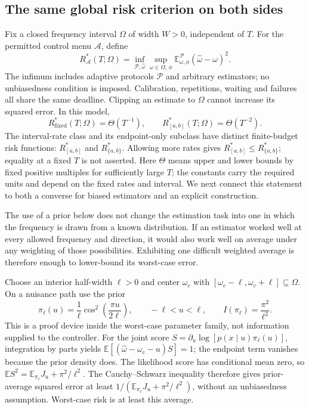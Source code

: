 \documentclass[11pt,a4paper]{article}
\numberwithin{equation}{section}
\theoremstyle{remark}
\begin{document}
\subsection{The same global risk criterion on both sides}

Fix a closed frequency interval $\Omega$ of width $W>0$, independent of $T$.
For the permitted control menu $\mathcal A$, define
\begin{equation}
 R_{\mathcal A}^*(T;\Omega)
 =\inf_{\mathcal P,\widehat\omega}
 \sup_{\omega\in\Omega,\,\phi}
 \mathbb E_{\omega,\phi}^{\mathcal P}
       (\widehat\omega-\omega)^2.
 \label{markov:risk}
\end{equation}
The infimum includes adaptive protocols $\mathcal P$ and arbitrary estimators;
no unbiasedness condition is imposed. Calibration, repetitions, waiting and
failures all share the same deadline. Clipping an estimate to $\Omega$ cannot
increase its squared error. In this model,
\begin{equation}
 R_{\mathrm{fixed}}^*(T;\Omega)=\Theta(T^{-1}),\qquad
 R_{[a,b]}^*(T;\Omega)=\Theta(T^{-2}).
 \label{markov:globaltheorem}
\end{equation}
The interval-rate class and its endpoint-only subclass have distinct
finite-budget risk functions: $R_{[a,b]}^*$ and $R_{\{a,b\}}^*$.
Allowing more rates gives $R_{[a,b]}^*\le R_{\{a,b\}}^*$; equality at a
fixed $T$ is not asserted. Here $\Theta$ means upper and lower bounds by fixed positive multiples for
sufficiently large $T$; the constants carry the required units and depend on
the fixed rates and interval. We next connect this statement to both a
converse for biased estimators and an explicit construction.

The use of a prior below does not change the estimation task into one in which
the frequency is drawn from a known distribution. If an estimator worked
well at every allowed frequency and direction, it would also work well on
average under any weighting of those possibilities. Exhibiting one difficult
weighted average is therefore enough to lower-bound its worst-case error.

Choose an interior half-width $\ell>0$ and center $\omega_c$ with
$[\omega_c-\ell,\omega_c+\ell]\subseteq\Omega$. On a nuisance path use the prior
\begin{equation}
 \pi_\ell(u)=\frac1\ell\cos^2\left(\frac{\pi u}{2\ell}\right),
 \qquad -\ell<u<\ell,\qquad I(\pi_\ell)=\frac{\pi^2}{\ell^2}.
\end{equation}
This is a proof device inside the worst-case parameter family, not information
supplied to the controller. For the joint score
$S=\partial_u\log[p(x\mid u)\pi_\ell(u)]$, integration by parts yields
$\mathbb E[(\widehat\omega-\omega_c-u)S]=1$; the endpoint term vanishes
because the prior density does. The likelihood score has conditional mean
zero, so $\mathbb E S^2=\mathbb E_{\pi_\ell}J_u+\pi^2/\ell^2$.
The Cauchy--Schwarz inequality therefore gives prior-average squared error at
least $1/(\mathbb E_{\pi_\ell}J_u+\pi^2/\ell^2)$, without an unbiasedness assumption.
Worst-case risk is at least this average.
\end{document}

